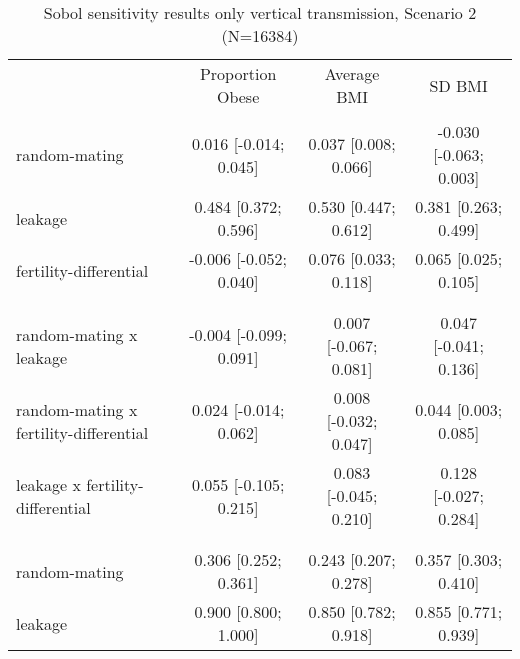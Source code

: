 
    \begin{table}[htp]
    \renewcommand{\arraystretch}{1.3}
    \setlength{\tabcolsep}{5pt}
    \caption{Sobol sensitivity results only vertical transmission, Scenario 2 (N=16384)}
    \label{tab:sobol-vt}
    \footnotesize
    \centering
    \begin{threeparttable}
    \begin{tabular}{lccc}
    \hline
    \addlinespace
    & Proportion Obese & Average BMI & SD BMI \\
    \addlinespace
    \hline
    \addlinespace[6pt]
    \multicolumn{4}{l}{\hspace{1em} S1} \\
\hspace{1.5em} random-mating & 0.016 [-0.014; 0.045]   & 0.037 [0.008; 0.066]   & -0.030 [-0.063; 0.003] \\
	  \hspace{1.5em} leakage & 0.484 [0.372; 0.596]   & 0.530 [0.447; 0.612]   & 0.381 [0.263; 0.499] \\
	  \hspace{1.5em} fertility-differential & -0.006 [-0.052; 0.040]   & 0.076 [0.033; 0.118]   & 0.065 [0.025; 0.105] \\
	 \\
    \addlinespace[12pt]
    \multicolumn{4}{l}{\hspace{1em} S2} \\ 
\hspace{1.5em} random-mating x leakage & -0.004 [-0.099; 0.091]   & 0.007 [-0.067; 0.081]   & 0.047 [-0.041; 0.136] \\
	  \hspace{1.5em} random-mating x fertility-differential & 0.024 [-0.014; 0.062]   & 0.008 [-0.032; 0.047]   & 0.044 [0.003; 0.085] \\
	  \hspace{1.5em} leakage x fertility-differential & 0.055 [-0.105; 0.215]   & 0.083 [-0.045; 0.210]   & 0.128 [-0.027; 0.284] \\
	 \\
    \addlinespace[12pt]
    \multicolumn{4}{l}{\hspace{1em} ST} \\ 
\hspace{1.5em} random-mating & 0.306 [0.252; 0.361]   & 0.243 [0.207; 0.278]   & 0.357 [0.303; 0.410] \\
	  \hspace{1.5em} leakage & 0.900 [0.800; 1.000]   & 0.850 [0.782; 0.918]   & 0.855 [0.771; 0.939] \\

\end{tabular}
\end{threeparttable}
\end{table}
